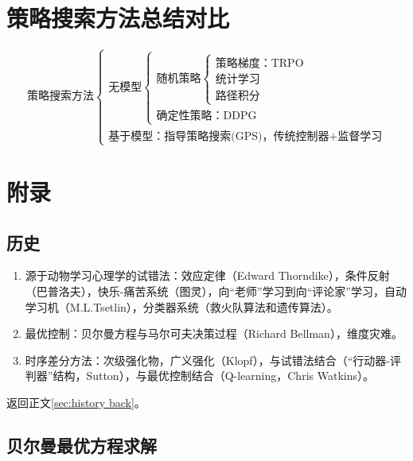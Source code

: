\documentclass[
12pt, %
a4paper, 
oneside, %
headinclude,footinclude, %
]{scrartcl}
\begin{document}
\section{策略搜索方法总结对比}
$$
\text{策略搜索方法} \begin{cases} 
\text{无模型} \begin{cases} 
\text{随机策略} \begin{cases} 
\text{策略梯度：TRPO} \\ 
\text{统计学习} \\ 
\text{路径积分} 
\end{cases} \\ 
\text{确定性策略：DDPG}
\end{cases} \\ 
\text{基于模型：指导策略搜索(GPS)，传统控制器+监督学习}
\end{cases}
$$
\section{附录}
\subsection[历史]{历史}\label{sec:history}
\begin{enumerate}
\item 源于动物学习心理学的试错法：效应定律（Edward Thorndike），条件反射（巴普洛夫），快乐-痛苦系统（图灵），向“老师”学习到向“评论家”学习，自动学习机（M.L.Tsetlin），分类器系统（救火队算法和遗传算法）。
\item 最优控制：贝尔曼方程与马尔可夫决策过程（Richard Bellman），维度灾难。
\item 时序差分方法：次级强化物，广义强化（Klopf），与试错法结合（“行动器-评判器”结构，Sutton），与最优控制结合（Q-learning，Chris Watkins）。
\end{enumerate}

返回正文\ref{sec:history back}。
\subsection[贝尔曼最优方程求解]{贝尔曼最优方程求解}\label{sec:Scalability Mapping}
\end{document}
